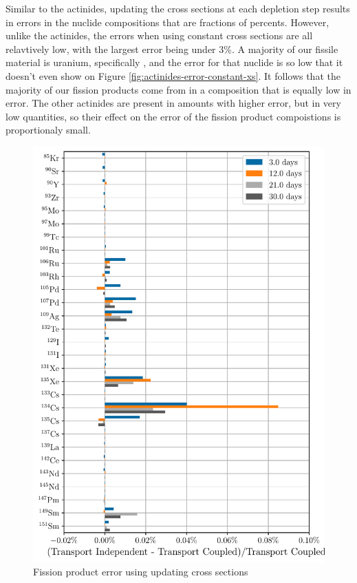 \documentclass[a4paper,fleqn]{cas-dc}
\begin{document}
    Similar to the actinides, updating the cross sections at each depletion step
    results in errors in the nuclide compositions  that are fractions of
    percents. However, unlike the actinides, the errors when using constant
    cross sections are all relavtively low, with the largest error being under
    3\%. A majority of our fissile material is uranium, specifically
    , and the error for that nuclide is so low that it doesn't even
    show on Figure \ref{fig:actinides-error-constant-xs}. It follows that the
    majority of our fission products come from  in a composition
    that is equally low in error. The other actinides are present in amounts
    with higher error, but in very low quantities, so their effect on the error
    of the fission product compoistions is proportionaly small.
    
    \begin{figure}[htpb]
        \centering
        \includegraphics[width=\linewidth]{figs/fission_products_updating_xs_predictor_fission_q_days.pdf}
        \caption{Fission product error using  updating cross sections}
        \label{fig:fp-error-updating-xs}
    \end{figure}
\end{document}
